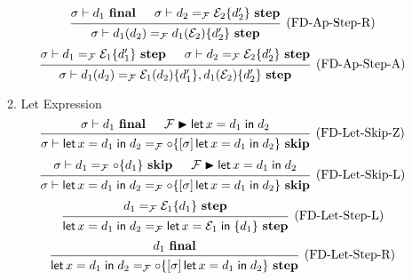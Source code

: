 \documentclass{article}
\newcommand{\entails}{\mathrel{\mathop{\vdash}}}
\newcommand{\skips}{\mathrel{\mathop{\blacktriangleright}}}
\newcommand{\final}{~\mathbf{final}}
\newcommand{\istep}{~\mathbf{step}}
\newcommand{\iskip}{~\mathbf{skip}}
\newcommand{\fin}{\mathrel{\mathop{\mathsf{in}}}}
\newcommand{\flet}{\operatorname{\mathsf{let}}}
\begin{document}
\begin{enumerate}
\begin{enumerate}
\[        \]
        \[
          \begin{prooftree}
            \hypo{\sigma \entails d_1 \final}
            \hypo{
              \sigma \entails
              d_2 =_\mathcal{F} \mathcal{E}_2 \{ d_2' \} \istep
            }
            \infer2[(FD-Ap-Step-R)]{
              \sigma \entails
              d_1(d_2)
              =_\mathcal{F}
              d_1(\mathcal{E}_2) \{d_2'\} \istep
            }
          \end{prooftree}
        \]
        \[
          \begin{prooftree}
            \hypo{\sigma \entails d_1 =_\mathcal{F} \mathcal{E}_1 \{ d_1' \} \istep}
            \hypo{\sigma \entails d_2 =_\mathcal{F} \mathcal{E}_2 \{d_2'\} \istep}
            \infer2[(FD-Ap-Step-A)]{
              \sigma \entails
              d_1(d_2)
              =_\mathcal{F}
              \mathcal{E}_1 (d_2) \{d_1'\}, d_1(\mathcal{E}_2)\{d_2'\} \istep
            }
          \end{prooftree}
        \]

      \item Let Expression
        \[
          \begin{prooftree}
            \hypo{\sigma \entails d_1 \final}
            \hypo{\mathcal{F} \skips \flet x = d_1 \fin d_2}
            \infer2[(FD-Let-Skip-Z)]{
              \sigma \entails
              \flet x = d_1 \fin d_2
              =_\mathcal{F}
              \circ \{ [\sigma] \flet x = d_1 \fin d_2 \} \iskip
            }
          \end{prooftree}
        \]
        \[
          \begin{prooftree}
            \hypo{\sigma \entails d_1 =_\mathcal{F} \circ \{ d_1 \} \iskip}
            \hypo{\mathcal{F} \skips \flet x = d_1 \fin d_2}
            \infer2[(FD-Let-Skip-L)]{
              \sigma \entails
              \flet x = d_1 \fin d_2
              =_\mathcal{F}
              \circ \{ [\sigma] \flet x = d_1 \fin d_2 \} \iskip
            }
          \end{prooftree}
        \]
        \[
          \begin{prooftree}
            \hypo{d_1 =_\mathcal{F} \mathcal{E}_1 \{ d_1 \} \istep}
            \infer1[(FD-Let-Step-L)]{
              \flet x = d_1 \fin d_2
              =_\mathcal{F}
              \flet x = \mathcal{E}_1 \fin \{ d_1 \} \istep
            }
          \end{prooftree}
        \]
        \[
          \begin{prooftree}
            \hypo{d_1 \final}
            \infer1[(FD-Let-Step-R)]{
              \flet x = d_1 \fin d_2
              =_\mathcal{F}
              \circ \{ [\sigma] \flet x = d_1 \fin d_2 \} \istep
            }
          \end{prooftree}
        \]


\end{enumerate}
\end{enumerate}
\end{document}

